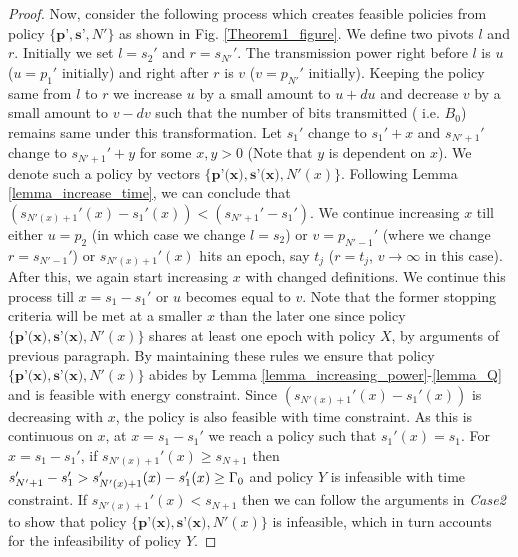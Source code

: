 \begin{proof}
Now, consider the following process which creates feasible policies from policy $\{\textbf{p'},\textbf{s'},N'\}$ as shown in Fig. \ref{Theorem1_figure}. We define two pivots $l$ and $r$. Initially we set $l=s_2'$ and $r=s_{N'}'$. The transmission power right before $l$ is $u$ ($u=p_1'$ initially) and right after $r$ is $v$ ($v=p_{N'}'$ initially). Keeping the policy same from $l$ to $r$ we increase $u$ by a small amount to $u+du$ and decrease $v$ by a small amount to $v-dv$ such that the number of bits transmitted ( i.e. $B_0$) remains same under this transformation. Let $s_1'$ change to $s_1'+x$ and $s_{N'+1}'$ change to $s_{N'+1}'+y$ for some $x,y>0$ (Note that $y$ is dependent on $x$). We denote such a policy by vectors $\{\textbf{p'(x)},\textbf{s'(x)},N'(x)\}$. Following Lemma \ref{lemma_increase_time}, we can conclude that $(s_{N'(x)+1}'(x)-s_1'(x))<(s_{N'+1}'-s_1')$. We continue increasing $x$ till either $u=p_2$ (in which case we change $l=s_2$) or $v=p_{N'-1}'$ (where we change $r=s_{N'-1}'$) or $s_{N'(x)+1}'(x)$ hits an epoch, say $t_j$ ($r=t_j$, $v\rightarrow\infty$ in this case). After this, we again start increasing $x$ with changed definitions. We continue this process till $x=s_1-s_1'$  or $u$ becomes equal to $v$. Note that the former stopping criteria will be met at a smaller $x$ than the later one since policy $\{\textbf{p'(x)},\textbf{s'(x)},N'(x)\}$ shares at least one epoch with policy $X$, by arguments of previous paragraph. By maintaining these rules we ensure that policy $\{\textbf{p'(x)},\textbf{s'(x)},N'(x)\}$ abides by Lemma \ref{lemma_increasing_power}-\ref{lemma_Q} and is feasible with energy constraint. Since $\left( s_{N'(x)+1}'(x)-s_1'(x)\right)$ is decreasing with $x$, the policy is also feasible with time constraint. As this is continuous on $x$, at $x=s_1-s_1'$ we reach a policy such that $s_1'(x)=s_1$. For $x=s_1-s_1'$, if $s_{N'(x)+1}'(x)\ge s_{N+1}$ then $s_{N'+1}'-s_1'>s_{N'(x)+1}'(x)-s_1'(x)\ge \Gamma_0$ and policy $Y$ is infeasible with time constraint. If $s_{N'(x)+1}'(x)< s_{N+1}$ then we can follow the arguments in \textit{Case2} to show that policy $\{\textbf{p'(x)},\textbf{s'(x)},N'(x)\}$ is infeasible, which in turn accounts for the infeasibility of policy $Y$.
\end{proof}

























